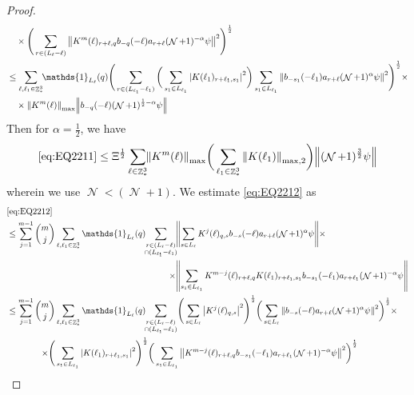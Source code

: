 \documentclass[sn-mathphys, Numbered ,a4paper]{sn-jnl}%
\DeclareMathOperator{\Z}{\mathbb{Z}}
\DeclareMathOperator{\NN}{\mathcal{N}}
\newcommand{\half}{\frac{1}{2}}
\theoremstyle{plain}
\theoremstyle{definition}
\theoremstyle{remark}
\theoremstyle{plain}
\theoremstyle{definition}
\theoremstyle{remark}
\begin{document}
\begin{proof}
\begin{align}
 	&\quad \times \Bigg( \sum\limits_{r\in (L_{\ell}-\ell)}  \norm{K^{m}(\ell)_{r+\ell,q}  b_{-q}(-\ell) a_{r+\ell} (\NN+1)^{-\alpha}\psi }^2\Bigg)^\half \nonumber\\
 	&\leq \sum\limits_{\ell,\ell_1 \in \Z^3_*} \!\!\mathds{1}_{L_\ell}(q) \Bigg( \sum\limits_{r\in (L_{\ell_1}-\ell_1)} \bigg( \sum\limits_{s_1 \in L_{\ell_1}}\abs{K(\ell_1)_{r+\ell_1,s_1}}^2\bigg) \sum\limits_{s_1 \in L_{\ell_1}} \norm{ b_{-s_1}(-\ell_1)  a_{r+\ell} (\NN+1)^{\alpha}\psi}^2\Bigg)^\half \times\nonumber\\
 	&\quad \times  \norm{  K^{m}(\ell)}_{\mathrm{max}} \norm{b_{-q}(-\ell) (\NN+1)^{\half-\alpha}\psi } \nonumber
 \end{align}
 Then for $\alpha = \half$, we have 
 \begin{equation}
 	\eqref{eq:EQ2211}\leq \Xi^\half \sum\limits_{\ell \in \Z^3_*} \!\! \norm{  K^{m}(\ell)}_{\mathrm{max}} \bigg(\sum\limits_{\ell_1 \in \Z^3_*} \norm{K(\ell_1)}_{\mathrm{max,2}} \bigg) \norm{ (\NN+1)^{\frac{3}{2}}\psi}  \label{eq:estEQ2211} 
 \end{equation}
 wherein we use $\NN<(\NN+1)$.
 We estimate \eqref{eq:EQ2212} as 
   \begin{alignat}{2}
 	&\eqref{eq:EQ2212}\nonumber\\
 	&\leq \sum\limits_{j=1}^{m-1} {{m}\choose j} \sum\limits_{\ell, \ell_1\in \Z^3_*} \mathds{1}_{L_{\ell}}(q)\!\! \begin{aligned}[t]
 		\sum\limits_{\substack{r\in (L_{\ell}-\ell) \\ \cap (L_{\ell_1}-\ell_1)}}\! &\norm{ \sum\limits_{s \in L_\ell} K^{j}(\ell)_{q,s}  b_{-s}(-\ell) a_{r+\ell} (\NN+1)^{\alpha}\psi}\times\nonumber \\\times &\norm{\sum\limits_{s_1 \in L_{\ell_1}} K^{m-j}(\ell)_{r+\ell,q} K(\ell_1)_{r+\ell_1,s_1} b_{-s_1}(-\ell_1)  a_{r+\ell_1} (\NN+1)^{-\alpha}\psi }
 	\end{aligned} \nonumber\\
 	&\leq \sum\limits_{j=1}^{m-1} \begin{aligned}[t] {{m}\choose j} &\sum\limits_{\ell, \ell_1\in \Z^3_*} \mathds{1}_{L_{\ell}}(q)\!\! 
 		\sum\limits_{\substack{r\in (L_{\ell}-\ell) \\ \cap (L_{\ell_1}-\ell_1)}}\! \Bigg( \sum\limits_{s \in L_\ell} \abs{K^{j}(\ell)_{q,s}}^2\Bigg)^\half \bigg( \sum\limits_{s \in L_\ell}\norm{  b_{-s}(-\ell) a_{r+\ell} (\NN+1)^{\alpha}\psi}^2\bigg)^\half \times\nonumber\\ \times \Bigg( &\sum\limits_{s_1 \in L_{\ell_1}} \abs{ K(\ell_1)_{r+\ell_1,s_1} }^2\Bigg)^\half \bigg(\sum\limits_{s_1 \in L_{\ell_1}}\norm{ K^{m-j}(\ell)_{r+\ell,q}  b_{-s_1}(-\ell_1)  a_{r+\ell_1} (\NN+1)^{-\alpha}\psi }^2\bigg)^\half

\end{aligned}
\end{alignat}
\end{proof}
\end{document}
